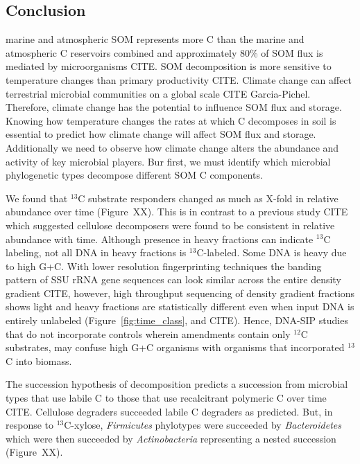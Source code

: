\subsection{Conclusion} 
marine and atmospheric SOM represents more C than the marine and atmospheric
C reservoirs combined and approximately 80\% of SOM flux is mediated by
microorganisms CITE. SOM decomposition is more sensitive to temperature changes
than primary productivity CITE. Climate change can affect terrestrial microbial
communities on a global scale CITE Garcia-Pichel. Therefore, climate change has
the potential to influence SOM flux and storage. Knowing how temperature
changes the rates at which C decomposes in soil is essential to predict how
climate change will affect SOM flux and storage. Additionally we need to
observe how climate change alters the abundance and activity of key microbial
players. Bur first, we must identify which microbial phylogenetic types
decompose different SOM C components.

We found that $^{13}$C substrate responders changed as much as X-fold in
relative abundance over time (Figure~XX). This is in contrast to
a previous study CITE which suggested cellulose decomposers were found to
be consistent in relative abundance with time. Although presence in heavy
fractions can indicate $^{13}$C labeling, not all DNA in heavy fractions
is $^{13}$C-labeled. Some DNA is heavy due to high G+C.
With lower resolution fingerprinting techniques the banding pattern of SSU
rRNA gene sequences can look similar across the entire density gradient
CITE, however, high throughput sequencing of density gradient fractions
shows light and heavy fractions are statistically different even when
input DNA is entirely unlabeled (Figure~\ref{fig:time_class}, and CITE).
Hence, DNA-SIP studies that do not incorporate controls wherein amendments
contain only $^{12}$C substrates, may confuse high G+C organisms with
organisms that incorporated $^{13}$C into biomass. 

The succession hypothesis of decomposition predicts a succession from
microbial types that use labile C to those that use recalcitrant polymeric
C over time CITE. Cellulose degraders succeeded labile C degraders as
predicted. But, in response to $^{13}$C-xylose,  \textit{Firmicutes}
phylotypes were succeeded by \textit{Bacteroidetes} which were then
succeeded by \textit{Actinobacteria} representing a nested succession
(Figure~XX). 

